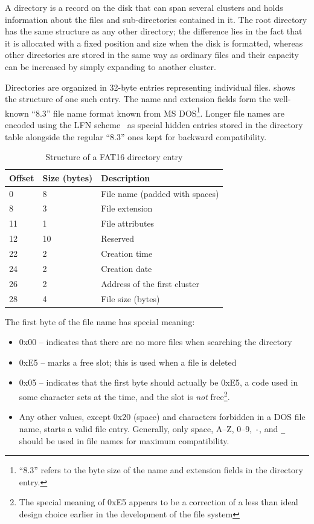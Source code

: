 A directory is a record on the disk that can span several clusters and holds information about the files and sub-directories contained in it. The root directory has the same structure as any other directory; the difference lies in the fact that it is allocated with a fixed position and size when the disk is formatted, whereas other directories are stored in the same way as ordinary files and their capacity can be increased by simply expanding to another cluster.

Directories are organized in 32-byte entries representing individual files.  shows the structure of one such entry. The name and extension fields form the well-known ``8.3'' file name format known from MS DOS\footnote{``8.3'' refers to the byte size of the name and extension fields in the directory entry.}. Longer file names are encoded using the \gls{LFN} scheme~\cite{fat-lfn} as special hidden entries stored in the directory table alongside the regular ``8.3'' ones kept for backward compatibility.

\begin{table}
	\centering
	\begin{tabular}{lll}
		\toprule
		\textbf{Offset} & \textbf{Size (bytes)}  & \textbf{Description}\\
		\midrule
		0 & 8 & File name (padded with spaces) \\
		8 & 3 & File extension \\
		11 & 1 & File attributes \\
		12 & 10 & Reserved \\
		22 & 2 & Creation time \\
		24 & 2 & Creation date \\
		26 & 2 & Address of the first cluster \\
		28 & 4 & File size (bytes) \\
		\bottomrule
	\end{tabular}
	\caption{\label{tab:fat16_dir_entry}Structure of a FAT16 directory entry}
\end{table}

\noindent
The first byte of the file name has special meaning:

\begin{itemize}
	\item 0x00 -- indicates that there are no more files when searching the directory
	\item 0xE5 -- marks a free slot; this is used when a file is deleted
	\item 0x05 -- indicates that the first byte should actually be 0xE5, a code used in some character sets at the time, and the slot is \textit{not} free\footnote{The special meaning of 0xE5 appears to be a correction of a less than ideal design choice earlier in the development of the file system}.
	\item Any other values, except 0x20 (space) and characters forbidden in a DOS file name, starts a valid file entry. Generally, only space, A--Z, 0--9, \verb|-|, and \verb|_| should be used in file names for maximum compatibility.
\end{itemize}


